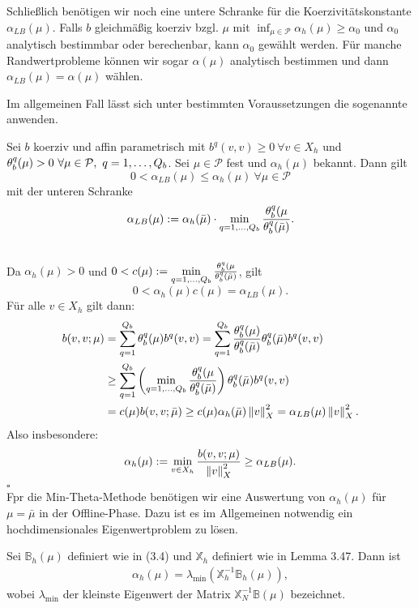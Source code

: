 Schließlich benötigen wir noch eine untere Schranke für die Koerzivitätskonstante $\alpha_{LB}(\mu)$.
Falls $b$ gleichmäßig koerziv bzgl. $\mu$ mit $\inf_{\mu\in\mathcal{P}}\alpha_h(\mu)\ge \alpha_0$ und $\alpha_0$ analytisch bestimmbar oder berechenbar, kann $\alpha_0$ gewählt werden.
Für manche Randwertprobleme können wir sogar $\alpha(\mu)$ analytisch bestimmen und dann $\alpha_{LB}(\mu) = \alpha(\mu)$ wählen.

Im allgemeinen Fall lässt sich unter bestimmten Voraussetzungen die sogenannte  anwenden.

Sei $b$ koerziv und affin parametrisch mit $b^q(v,v)\ge 0 ~\forall v\in X_h$ und $\theta_b^q(\mu)>0~\forall\mu\in\mathcal{P},~q=1, \dots ,Q_b$.
Sei $\mu\in\mathcal{P}$ fest und $\alpha_h(\mu)$ bekannt.
Dann gilt
\[
0<\alpha_{LB}(\mu) \le \alpha_h(\mu)~\forall\mu\in\mathcal{P}
\]
mit der unteren Schranke 
\[
\alpha_{LB}(\mu) := \alpha_h(\bar{\mu}) \cdot \min\limits_{q=1, \dots ,Q_b} \frac{\theta_b^q(\mu}{\theta_b^q(\bar{\mu})}.
\]

\\
Da $\alpha_h(\mu)> 0$ und $0< c(\mu) := \min\limits_{q=1, \dots ,Q_b} \frac{\theta_b^q(\mu}{\theta_b^q(\bar{\mu})}$, gilt
\[
0 < \alpha_h(\mu) c(\mu) = \alpha_{LB}(\mu).
\]
Für alle $v\in X_h$ gilt dann:
\begin{align*}
b(v,v;\mu)&= \sum_{q=1}^{Q_b} \theta_b^q(\mu)b^q(v,v) = \sum_{q=1}^{Q_b} \frac{\theta_b^q(\mu)}{\theta_b^q(\bar{\mu})} \theta_b^q(\bar{\mu})b^q(v,v)\\
&\ge \sum_{q=1}^{Q_b} \left( \min\limits_{q=1, \dots ,Q_b} \frac{\theta_b^q(\mu}{\theta_b^q(\bar{\mu})}\right) \theta_b^q(\bar{\mu})b^q(v,v)\\
&= c(\mu) b(v,v;\bar{\mu}) \ge c(\mu) \alpha_h(\bar{\mu})\left\Vert v\right\Vert_X^2 = \alpha_{LB}(\mu) \left\Vert v\right\Vert_X^2.
\end{align*}
Also insbesondere:
\[
\alpha_h(\mu) := \min\limits_{v\in X_h} \frac{b(v,v;\mu)}{\left\Vert v\right\Vert_X^2}\ge \alpha_{LB}(\mu).
\]
\hfill $\square$\\

Fpr die Min-Theta-Methode benötigen wir eine Auswertung von $\alpha_h(\mu)$ für $\mu=\bar{\mu}$ in der Offline-Phase.
Dazu ist es im Allgemeinen notwendig ein hochdimensionales Eigenwertproblem zu lösen.

Sei $\mathbb{B}_h(\mu)$ definiert wie in (3.4) und $\mathbb{X}_h$ definiert wie in Lemma 3.47.
Dann ist
\begin{align}
\alpha_h(\mu) = \lambda_{\min} (\mathbb{X}_h^{-1}\mathbb{B}_h(\mu)),
\end{align}
wobei $\lambda_{\min}$ der kleinste Eigenwert der Matrix $\mathbb{X}_N^{-1}\mathbb{B}(\mu)$ bezeichnet.

